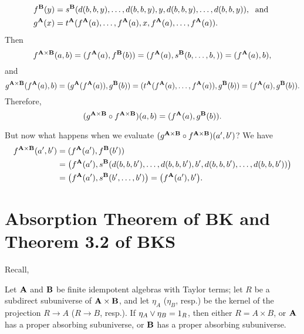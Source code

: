 \newpage



\bigskip

\begin{align*}
  f^{\mathbf{B}}(y) &= s^{\mathbf{B}}(d(b,b,y), \dots, d(b,b,y), y, d(b,b,y), \dots, d(b,b,y)), \; \text{ and }\\
  g^{\mathbf{A}}(x) &= t^{\mathbf{A}}(f^{\mathbf{A}}(a), \dots, f^{\mathbf{A}}(a), x, f^{\mathbf{A}}(a), \dots, f^{\mathbf{A}}(a)).
\end{align*}
Then
\[
f^{\mathbf{A}\times \mathbf{B}} (a,b) =
(f^{\mathbf{A}} (a), f^{\mathbf{B}}(b)) = (f^{\mathbf{A}} (a), s^{\mathbf{B}}(b, \dots, b, )) = (f^{\mathbf{A}} (a), b),
\]
and 
\[
g^{\mathbf{A}\times \mathbf{B}} (f^{\mathbf{A}} (a), b) =
(g^{\mathbf{A}} (f^{\mathbf{A}} (a)), g^{\mathbf{B}}(b))=
(t^{\mathbf{A}}(f^{\mathbf{A}}(a), \dots, f^{\mathbf{A}}(a)),g^{\mathbf{B}}(b))=
(f^{\mathbf{A}} (a), g^{\mathbf{B}} (b)).
\]
Therefore,
\[
(g^{\mathbf{A}\times \mathbf{B}}\circ f^{\mathbf{A}\times \mathbf{B}}) (a,b) =
(f^{\mathbf{A}} (a), g^{\mathbf{B}} (b)).
\]

But now what happens when we evaluate 
$(g^{\mathbf{A}\times \mathbf{B}}\circ f^{\mathbf{A}\times \mathbf{B}}) (a',b')$?
We have
\begin{align*}
  f^{\mathbf{A}\times \mathbf{B}} (a',b') &=
  (f^{\mathbf{A}} (a'), f^{\mathbf{B}}(b')) \\&= \bigl(f^{\mathbf{A}} (a'), s^{\mathbf{B}}(d(b,b,b'), \dots,
  d(b,b,b'), b', d(b,b,b'),\dots, d(b,b,b'))\bigr)\\
  &= \bigl(f^{\mathbf{A}} (a'), s^{\mathbf{B}}(b', \dots, b')\bigr)= \bigl(f^{\mathbf{A}} (a'), b'\bigr).
\end{align*}


\section{Absorption Theorem of BK and Theorem 3.2 of BKS}
Recall,
\begin{theorem}
\label{thm:absorption}
Let $\mathbf{A}$ and $\mathbf{B}$ be finite
idempotent algebras with Taylor terms; let $R$ be a subdirect subuniverse of
$\mathbf{A} \times \mathbf{B}$, and let $\eta_A$ ($\eta_B$, resp.) be the kernel of the
projection $R \to A$ ($R \to B$, resp.).
If $\eta_A \vee \eta_B = 1_R$, then either $R = A \times B$, or
$\mathbf{A}$ has a proper absorbing subuniverse, or $\mathbf{B}$ has a proper absorbing subuniverse.
\end{theorem}


